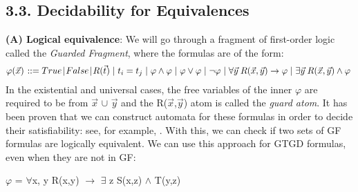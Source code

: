 \documentclass[11pt, a4paper, dvipsnames]{article}
\begin{document}
\subsection{3.3. Decidability for Equivalences}
\textbf{(A) Logical equivalence}:\newline
We will go through a fragment of first-order logic called the \textit{Guarded Fragment}, where the formulas are of the form:
\begin{gather*}
\varphi(\vec{x}) \hspace{0.1em} ::= True \hspace{0.1em} | \hspace{0.1em} False \hspace{0.1em} | \hspace{0.1em} R(\vec{t}) \hspace{0.3em} |\hspace{0.3em} t_{i} = t_{j} \hspace{0.3em}| \hspace{0.3em}\varphi \wedge \varphi \hspace{0.3em}| \hspace{0.3em}\varphi \vee \varphi \hspace{0.3em}| \hspace{0.3em}\neg \varphi \hspace{0.3em}| \hspace{0.3em}\forall \vec{y} \hspace{0.25em} R(\vec{x}, \vec{y}) \rightarrow \varphi \hspace{0.3em}|\hspace{0.3em} \exists \vec{y} \hspace{0.25em} R(\vec{x}, \vec{y}) \wedge \varphi\hspace{0.3em}
\end{gather*}
In the existential and universal cases, the free variables of the inner $\varphi$ are required to be from $\vec{x}$ $\cup$ $\vec{y}$ and the R($\vec{x}$,$\vec{y}$) atom is called the \textit{guard atom}.\newline
It has been proven that we can construct automata for these formulas in order to decide their satisfiability: see, for example, \cite{decidable}. With this, we can check if two sets of GF formulas are logically equivalent. We can use this approach for GTGD formulas, even when they are not in GF:
\begin{center}
$\varphi$ = $\forall$x, y R(x,y) $\rightarrow$ $\exists$ z S(x,z) $\wedge$ T(y,z)
\end{center}
\end{document}
